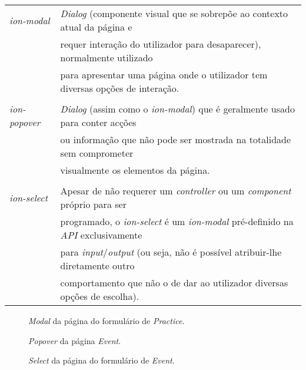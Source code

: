 \begin{tabular}{ll}
	\textit{ion-modal} & \textit{Dialog} (componente visual que se sobrepõe ao contexto atual da página e \\
	&requer interação do utilizador para desaparecer), normalmente utilizado \\
	&para apresentar uma página onde o utilizador tem diversas opções de interação.\\
	\\
	\textit{ion-popover} & \textit{Dialog} (assim como o \textit{ion-modal}) que é geralmente usado para conter acções \\
	&ou informação que não pode ser mostrada na totalidade sem comprometer\\
	& visualmente os elementos da página.\\
	\\
	\textit{ion-select} & Apesar de não requerer um \textit{controller} ou um \textit{component} próprio para ser \\
	&programado, o \textit{ion-select} é um \textit{ion-modal} pré-definido na \textit{API} exclusivamente \\
	&para \textit{input}/\textit{output} (ou seja, não é possível atribuir-lhe diretamente outro \\
	&comportamento que não o de dar ao utilizador diversas opções de escolha).\\
\end{tabular}

\begin{figure}[h]
	\begin{center}
	\end{center}
	\caption{\textit{Modal} da página do formulário de \textit{Practice}.}\label{fig:practiceformmodal}
\end{figure}
\newpage

\begin{figure}[h]
	\begin{center}
	\end{center}
	\caption{\textit{Popover} da página \textit{Event}.}\label{fig:eventpopover}
\end{figure}

\begin{figure}[h]
	\begin{center}
	\end{center}
	\caption{\textit{Select} da página do formulário de \textit{Event}.}\label{fig:eventformselect}
\end{figure}
\newpage

